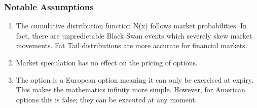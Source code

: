 \documentclass{article}
\begin{document}
\subsubsection {Notable Assumptions}
\begin{flushleft}
\begin{enumerate}
\item The cumulative distribution function N(x) follows market probabilities. In fact, there are unpredictable Black Swan events which severely skew market movements. Fat Tail distributions are more accurate for financial markets. 
\item  Market speculation has no effect on the pricing of options.
\item The option is a European option meaning it can only be exercised at expiry. This makes the mathematics infinity more simple. However, for American options this is false; they can be executed at any moment. 
\end{enumerate}

\end{flushleft}
\end{document}
